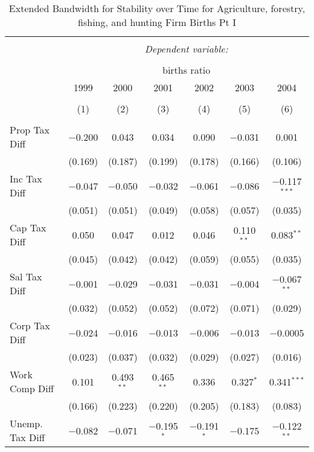 
\begin{table}[!htbp] \centering 
  \caption{Extended Bandwidth for Stability over Time for  Agriculture, forestry, fishing, and hunting Firm Births Pt I} 
  \label{11year_eb} 
\small 
\begin{tabular}{@{\extracolsep{5pt}}lcccccc} 
\\[-1.8ex]\hline 
\hline \\[-1.8ex] 
 & \multicolumn{6}{c}{\textit{Dependent variable:}} \\ 
\cline{2-7} 
\\[-1.8ex] & \multicolumn{6}{c}{births ratio} \\ 
 & 1999 & 2000 & 2001 & 2002 & 2003 & 2004 \\ 
\\[-1.8ex] & (1) & (2) & (3) & (4) & (5) & (6)\\ 
\hline \\[-1.8ex] 
 Prop Tax Diff & $-$0.200 & 0.043 & 0.034 & 0.090 & $-$0.031 & 0.001 \\ 
  & (0.169) & (0.187) & (0.199) & (0.178) & (0.166) & (0.106) \\ 
  Inc Tax Diff & $-$0.047 & $-$0.050 & $-$0.032 & $-$0.061 & $-$0.086 & $-$0.117$^{***}$ \\ 
  & (0.051) & (0.051) & (0.049) & (0.058) & (0.057) & (0.035) \\ 
  Cap Tax Diff & 0.050 & 0.047 & 0.012 & 0.046 & 0.110$^{**}$ & 0.083$^{**}$ \\ 
  & (0.045) & (0.042) & (0.042) & (0.059) & (0.055) & (0.035) \\ 
  Sal Tax Diff & $-$0.001 & $-$0.029 & $-$0.031 & $-$0.031 & $-$0.004 & $-$0.067$^{**}$ \\ 
  & (0.032) & (0.052) & (0.052) & (0.072) & (0.071) & (0.029) \\ 
  Corp Tax Diff & $-$0.024 & $-$0.016 & $-$0.013 & $-$0.006 & $-$0.013 & $-$0.0005 \\ 
  & (0.023) & (0.037) & (0.032) & (0.029) & (0.027) & (0.016) \\ 
  Work Comp Diff & 0.101 & 0.493$^{**}$ & 0.465$^{**}$ & 0.336 & 0.327$^{*}$ & 0.341$^{***}$ \\ 
  & (0.166) & (0.223) & (0.220) & (0.205) & (0.183) & (0.083) \\ 
  Unemp. Tax Diff & $-$0.082 & $-$0.071 & $-$0.195$^{*}$ & $-$0.191$^{*}$ & $-$0.175 & $-$0.122$^{**}$ \\ 

\end{tabular}
\end{table}
